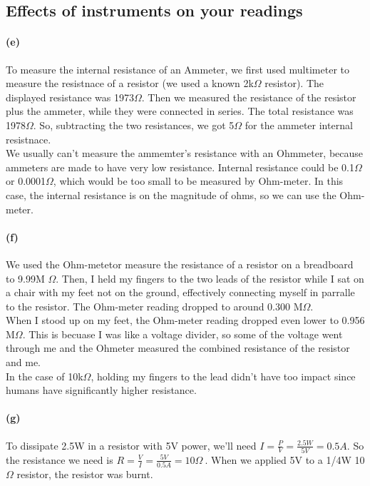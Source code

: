 \documentclass[]{article}
\begin{document}
\subsection*{ Effects of instruments on your readings}	
	\paragraph{ (e)}
	To measure the internal resistance of an Ammeter, we first used multimeter to measure the resistnace of a resistor (we used a known 2k$\Omega$ resistor). The displayed resistance was 1973$\Omega$. Then we measured the resistance of the resistor plus the ammeter, while they were connected in series. The total resistance was 1978$\Omega$. So, subtracting the two resistances, we got 5$\Omega$ for the ammeter internal resistnace.\\ We usually can't measure the ammemter's resistance with an Ohmmeter, because ammeters are made to have very low resistance. Internal resistance could be 0.1$\Omega$ or 0.0001$\Omega$, which would be too small to be measured by Ohm-meter. In this case, the internal resistance is on the magnitude of ohms, so we can use the Ohm-meter.
	\paragraph{ (f)}
	We used the Ohm-metetor measure the resistance of a resistor on a breadboard to 9.99M $\Omega$. Then, I held my fingers to the two leads of the resistor while I sat on a chair with my feet not on the ground, effectively connecting myself in parralle to the resistor. The Ohm-meter reading dropped to around 0.300 M$\Omega$.\\ When I stood up on my feet, the Ohm-meter reading dropped even lower to 0.956 M$\Omega$. This is becuase I was like a voltage divider, so some of the voltage went through me and the Ohmeter measured the combined resistance of the resistor and me. \\In the case of 10k$\Omega$, holding my fingers to the lead didn't have too impact since humans have significantly higher resistance. 

	\paragraph{ (g)}
	To dissipate 2.5W in a resistor with 5V power, we'll need $I=\frac{P}{V} =\frac{2.5W}{5V} =0.5A$. So the resistance we need is $R=\frac{V}{I}= \frac{5V}{0.5A}=10\Omega\ $. When we applied 5V to a 1/4W 10$\Omega$ resistor, the resistor was burnt.
	
\end{document}
